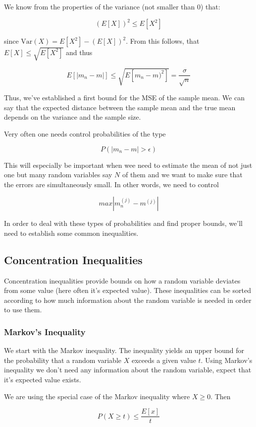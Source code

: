 \documentclass[12pt, authoryear]{elsarticle}
\begin{document}
We know from the properties of the variance (not smaller than 0) that:

$$(E[X])^2 \leq E[X^2]$$ 

since $\text{Var}(X) = E[X^2] - (E[X])^2$. From this follows, that $E[X] \leq \sqrt{E[X^2]}$ and thus

$$ E[|m_n -m |] \leq \sqrt{E[m_n - m)^2]} = \frac{\sigma}{\sqrt{n}}$$

Thus, we've established a first bound for the MSE of the sample mean. We can say that the expected distance between the sample mean and the true mean depends on the variance and the sample size.

Very often one needs control probabilities of the type 

$$P(|m_n - m| > \epsilon) $$

This will especially be important when wee need to estimate the mean of not just one but many random variables say $N$ of them and we want to make sure that the errors are simultaneously small. In other words, we need to control 

$$max | m_n^{(j)} - m^{(j)}|$$ 

In order to deal with these types of probabilities and find proper bounds, we'll need to establish some common inequalities.

\subsection{Concentration Inequalities}

Concentration inequalities provide bounds on how a random variable deviates from some value (here often it's expected value). These inequalities can be sorted according to how much information about the random variable is needed in order to use them.

\subsubsection{Markov's Inequality} \label{markov_ineq}

We start with the Markov inequality. The inequality yields an upper bound for the probability that a random variable $X$ exceeds a given value $t$. Using Markov's inequality we don't need any information about the random variable, expect that it's expected value exists.

We are using the special case of the Markov inequality where $X \geq 0$. Then

$$ P(X \geq t) \leq \frac{E[x]}{t}$$
\end{document}
